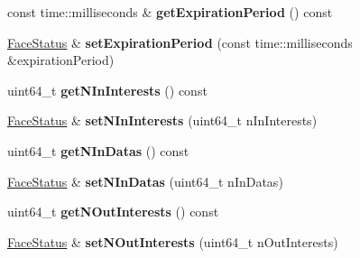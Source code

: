 \begin{DoxyCompactItemize}
\item 
const time\+::milliseconds \& {\bfseries get\+Expiration\+Period} () const\hypertarget{classndn_1_1nfd_1_1FaceStatus_a4b55220965e4ba6892f5adf81501a450}{}\label{classndn_1_1nfd_1_1FaceStatus_a4b55220965e4ba6892f5adf81501a450}

\item 
\hyperlink{classndn_1_1nfd_1_1FaceStatus}{Face\+Status} \& {\bfseries set\+Expiration\+Period} (const time\+::milliseconds \&expiration\+Period)\hypertarget{classndn_1_1nfd_1_1FaceStatus_ae5661eda5fa61ed993fed1ce5b99b2f1}{}\label{classndn_1_1nfd_1_1FaceStatus_ae5661eda5fa61ed993fed1ce5b99b2f1}

\item 
uint64\+\_\+t {\bfseries get\+N\+In\+Interests} () const\hypertarget{classndn_1_1nfd_1_1FaceStatus_aa4978b247415314cd2cc285e73d4d132}{}\label{classndn_1_1nfd_1_1FaceStatus_aa4978b247415314cd2cc285e73d4d132}

\item 
\hyperlink{classndn_1_1nfd_1_1FaceStatus}{Face\+Status} \& {\bfseries set\+N\+In\+Interests} (uint64\+\_\+t n\+In\+Interests)\hypertarget{classndn_1_1nfd_1_1FaceStatus_a58bc1cde281ffdfcc6fc1246e8d7589e}{}\label{classndn_1_1nfd_1_1FaceStatus_a58bc1cde281ffdfcc6fc1246e8d7589e}

\item 
uint64\+\_\+t {\bfseries get\+N\+In\+Datas} () const\hypertarget{classndn_1_1nfd_1_1FaceStatus_a31b44cec715b209e3778a99979a03c6a}{}\label{classndn_1_1nfd_1_1FaceStatus_a31b44cec715b209e3778a99979a03c6a}

\item 
\hyperlink{classndn_1_1nfd_1_1FaceStatus}{Face\+Status} \& {\bfseries set\+N\+In\+Datas} (uint64\+\_\+t n\+In\+Datas)\hypertarget{classndn_1_1nfd_1_1FaceStatus_af0e6d3b7a69a5c8e2d94832d88d92996}{}\label{classndn_1_1nfd_1_1FaceStatus_af0e6d3b7a69a5c8e2d94832d88d92996}

\item 
uint64\+\_\+t {\bfseries get\+N\+Out\+Interests} () const\hypertarget{classndn_1_1nfd_1_1FaceStatus_a57042f2948e6433d3e94d1d3a68f411a}{}\label{classndn_1_1nfd_1_1FaceStatus_a57042f2948e6433d3e94d1d3a68f411a}

\item 
\hyperlink{classndn_1_1nfd_1_1FaceStatus}{Face\+Status} \& {\bfseries set\+N\+Out\+Interests} (uint64\+\_\+t n\+Out\+Interests)\hypertarget{classndn_1_1nfd_1_1FaceStatus_a015171d9f126f481d2247c4ff504b788}{}\label{classndn_1_1nfd_1_1FaceStatus_a015171d9f126f481d2247c4ff504b788}


\end{DoxyCompactItemize}
